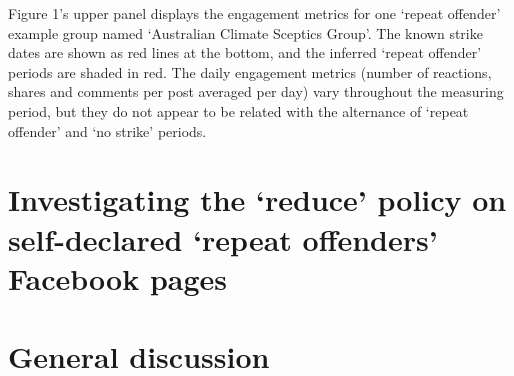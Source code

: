 \documentclass[11pt,a4paper]{article}
\begin{document}
Figure 1's upper panel displays the engagement metrics for one `repeat offender' example group named ‘Australian Climate Sceptics Group’. The known strike dates are shown as red lines at the bottom, and the inferred ‘repeat offender’ periods are shaded in red. The daily engagement metrics (number of reactions, shares and comments per post averaged per day) vary throughout the measuring period, but they do not appear to be related with the alternance of `repeat offender' and `no strike' periods.

\section{Investigating the `reduce’ policy on self-declared ‘repeat offenders’ Facebook pages}

\section{General discussion}



\end{document}
